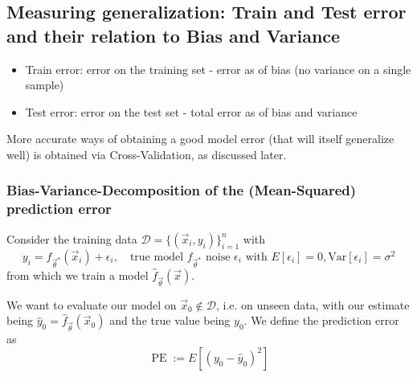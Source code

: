 
\subsection{Measuring generalization: Train and Test error and their relation to Bias and Variance}

\begin{itemize}
    \item \textcolor{blue1}{Train error}: error on the training set - error as of bias (no variance on a single sample)
    \item \textcolor{blue1}{Test error}: error on the test set - total error as of bias and variance
\end{itemize}
More accurate ways of obtaining a good model error (that will itself generalize well) is obtained
via Cross-Validation, as discussed later.

\subsubsection{Bias-Variance-Decomposition of the (Mean-Squared) prediction error}
Consider the training data $\mathcal{D} = \{(\vec{x}_i, y_i)\}_{i=1}^n$ with
\begin{equation}
    y_i = f_{\vec{\theta}^\star}(\vec{x}_i) + \epsilon_i, \quad \text{true model } f_{\vec{\theta}^\star} \text{ noise } \epsilon_i \text{ with } E[\epsilon_i] = 0, \text{Var}[\epsilon_i] = \sigma^2
\end{equation}
from which we train a model $\hat{f}_{\vec{\theta}}(\vec{x})$.

We want to evaluate our model on $\vec{x}_0 \notin \mathcal{D}$, i.e. on unseen data, with
our estimate being $\hat{y}_0 = \hat{f}_{\vec{\theta}}(\vec{x}_0)$ and the true
value being $y_0$. We define the prediction error as
\begin{equation}
    \operatorname{PE} := E\left[ (y_0 - \hat{y}_0)^2 \right]
\end{equation}

